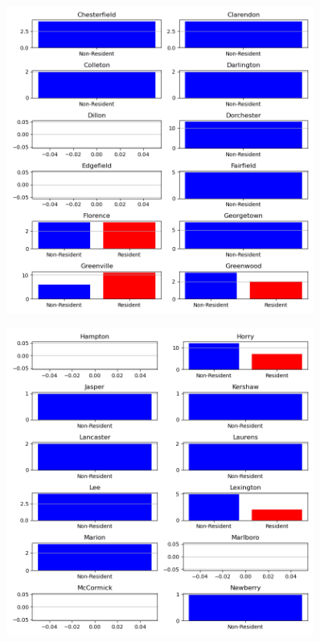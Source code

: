 \documentclass[11pt]{article}
\begin{document}
    \begin{figure}[H]
      \centering
      \includegraphics[width=0.9\textwidth]{../../../output/figures/Exploration/county_trial_hist_1.png}
    \end{figure}

    \begin{figure}[H]
      \centering
      \includegraphics[width=0.9\textwidth]{../../../output/figures/Exploration/county_trial_hist_2.png}
    \end{figure}
\end{document}
